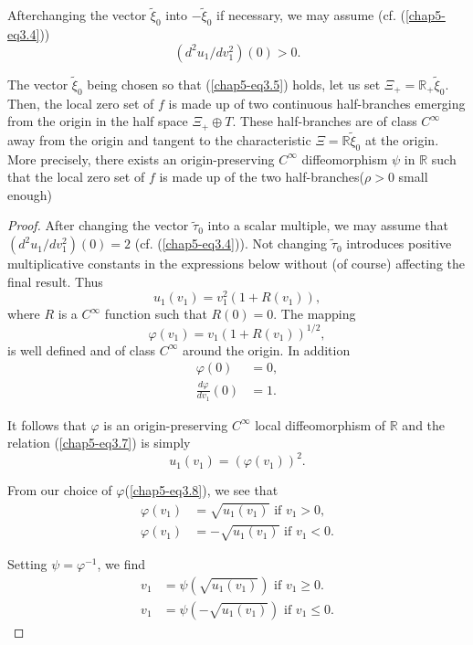 After\pageoriginale changing the vector $\widetilde{\xi}_{0}$ into
$-\widetilde{\xi}_{0}$ if necessary, we may assume
(cf. (\ref{chap5-eq3.4}))
\begin{equation*}
(d^{2}u_{1} / dv_{1}^{2})(0) > 0.\tag{3.5}\label{chap5-eq3.5}
\end{equation*}

\begin{theorem}\label{chap5-thm3.1}
The vector $\widetilde{\xi}_{0}$ being chosen so that
(\ref{chap5-eq3.5}) holds, let us set $\Xi_{+} = \mathbb{R}_{+}
\widetilde{\xi}_{0}$. Then, the local zero set of $f$ is made up of two
continuous half-branches emerging from the origin in the half space
$\Xi_{+} \oplus T$. These half-branches are of class $C^{\infty}$ away
from the origin and tangent to the characteristic $\Xi = \mathbb{R}
\widetilde{\xi}_{0}$ at the origin. More precisely, there exists an
origin-preserving $C^{\infty}$ diffeomorphism $\psi$ in $\mathbb{R}$
such that the local zero set of $f$ is made up of the two
half-branches\pageoriginale ($\rho > 0$ small enough)
\end{theorem}

\begin{proof}
After changing the vector $\widetilde{\tau}_{0}$ into a scalar
multiple, we may assume that $(d^{2}u_{1} / dv_{1}^{2})(0) = 2$
(cf. (\ref{chap5-eq3.4})). Not changing $\widetilde{\tau}_{0}$
introduces positive multiplicative constants in the expressions below
without (of course) affecting the final result. Thus
\begin{equation*}
u_{1}(v_{1}) = v_{1}^{2}(1 + R(v_{1})),\tag{3.7}\label{chap5-eq3.7}
\end{equation*}
where $R$ is a $C^{\infty}$ function such that $R(0) = 0$. The mapping 
\begin{equation*}
\varphi(v_{1}) = v_{1}(1 + R(v_{1}))^{1/2},\tag{3.8}\label{chap5-eq3.8}
\end{equation*}
is well defined and of class $C^{\infty}$ around the origin. In
addition
\begin{align*}
\varphi(0) & = 0,\\
\frac{d\varphi}{dv_{1}}(0) & = 1.
\end{align*}

It follows that $\varphi$ is an origin-preserving $C^{\infty}$ local
diffeomorphism of $\mathbb{R}$ and the relation (\ref{chap5-eq3.7}) is
simply
$$
u_{1}(v_{1}) = (\varphi(v_{1}))^{2}.
$$

From our choice of $\varphi$(\ref{chap5-eq3.8}), we see that
\begin{align*}
\varphi(v_{1}) & = \sqrt{u_{1} (v_{1})} \text{ if } v_{1} > 0,\\
\varphi(v_{1}) & = -\sqrt{u_{1} (v_{1})} \text{ if } v_{1} < 0.
\end{align*}

Setting $\psi = \varphi^{-1}$, we find
\begin{align*}
v_{1} & = \psi (\sqrt{u_{1}(v_{1})}) \text{ if } v_{1} \geq 0.\\
v_{1} & = \psi(- \sqrt{u_{1} (v_{1})}) \text{ if } v_{1} \leq 0.
\end{align*}\pageoriginale
\end{proof}

